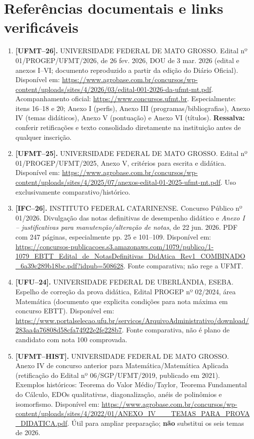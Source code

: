 \documentclass[11pt,a4paper]{article}
\begin{document}
\section{Referências documentais e links verificáveis}
\small
\begin{enumerate}
\item \textbf{[UFMT--26].} UNIVERSIDADE FEDERAL DE MATO GROSSO. Edital nº 01/PROGEP/UFMT/2026, de 26 fev. 2026, DOU de 3 mar. 2026 (edital e anexos I--VI; documento reproduzido a partir da edição do Diário Oficial). Disponível em: \url{https://www.agrobase.com.br/concursos/wp-content/uploads/sites/4/2026/03/edital-001-2026-da-ufmt-mt.pdf}. Acompanhamento oficial: \url{https://www.concursos.ufmt.br}. Especialmente: itens 16--18 e 20; Anexo I (perfis), Anexo III (programas/bibliografias), Anexo IV (temas didáticos), Anexo V (pontuação) e Anexo VI (títulos). \textbf{Ressalva:} conferir retificações e texto consolidado diretamente na instituição antes de qualquer inscrição.
\item \textbf{[UFMT--25].} UNIVERSIDADE FEDERAL DE MATO GROSSO. Edital nº 01/PROGEP/UFMT/2025, Anexo V, critérios para escrita e didática. Disponível em: \url{https://www.agrobase.com.br/concursos/wp-content/uploads/sites/4/2025/07/anexos-edital-01-2025-ufmt-mt.pdf}. Uso exclusivamente comparativo/histórico.
\item \textbf{[IFC--26].} INSTITUTO FEDERAL CATARINENSE. Concurso Público nº 01/2026. Divulgação das notas definitivas de desempenho didático e \emph{Anexo I -- justificativas para manutenção/alteração de notas}, de 22 jun. 2026. PDF com 247 páginas, especialmente pp. 25 e 101--109. Disponível em: \url{https://concursos-publicacoes.s3.amazonaws.com/1079/publico/1-1079_EBTT_Edital_de_NotasDefinitivas_DidAtica_Rev1_COMBINADO_6a39c289b18bc.pdf?idpub=508628}. Fonte comparativa; não rege a UFMT.
\item \textbf{[UFU--24].} UNIVERSIDADE FEDERAL DE UBERLÂNDIA, ESEBA. Espelho de correção da prova didática, Edital PROGEP nº 02/2024, área Matemática (documento que explicita condições para nota máxima em concurso EBTT). Disponível em: \url{https://www.portalselecao.ufu.br/servicos/ArquivoAdministrativo/download/283aa4a76808d58cfa74922e2fe228b7}. Fonte comparativa, não é plano de candidato com nota 100 comprovada.
\item \textbf{[UFMT--HIST].} UNIVERSIDADE FEDERAL DE MATO GROSSO. Anexo IV de concurso anterior para Matemática/Matemática Aplicada (retificação do Edital nº 06/SGP/UFMT/2019, publicado em 2021). Exemplos históricos: Teorema do Valor Médio/Taylor, Teorema Fundamental do Cálculo, EDOs qualitativas, diagonalização, anéis de polinômios e isomorfismo. Disponível em: \url{https://www.agrobase.com.br/concursos/wp-content/uploads/sites/4/2022/01/ANEXO_IV___TEMAS_PARA_PROVA_DIDATICA.pdf}. Útil para ampliar preparação; \textbf{não} substitui os seis temas de 2026.

\end{enumerate}
\end{document}
